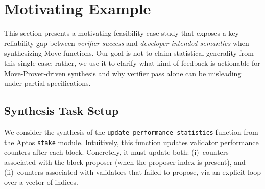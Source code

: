 \section{Motivating Example}\label{sec:motivating-example}

This section presents a motivating feasibility case study that exposes a key reliability gap between \emph{verifier success} and \emph{developer-intended semantics} when synthesizing Move functions.
Our goal is not to claim statistical generality from this single case; rather, we use it to clarify what kind of feedback is actionable for Move-Prover-driven synthesis and why verifier pass alone can be misleading under partial specifications.

\subsection{Synthesis Task Setup}

We consider the synthesis of the \texttt{update\_performance\_statistics} function from the Aptos \texttt{stake} module.
Intuitively, this function updates validator performance counters after each block.
Concretely, it must update both:
(i)~counters associated with the block proposer (when the proposer index is present), and
(ii)~counters associated with validators that failed to propose, via an explicit loop over a vector of indices.

